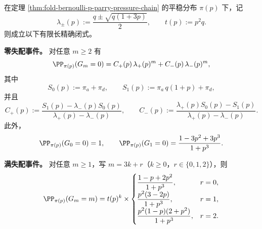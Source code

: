 \begin{theorem}[平稳态端点事件的有限长闭式]\label{thm:fold-bernoulli-p-endpoint-exact-finite}
在定理 \ref{thm:fold-bernoulli-p-parry-pressure-chain} 的平稳分布 \(\pi(p)\) 下，记
\[
\lambda_\pm(p):=\frac{q\pm \sqrt{q(1+3p)}}{2},
\qquad
t(p):=p^2q.
\]
则成立以下有限长精确闭式。

\medskip
\noindent\textbf{零失配事件。}
对任意 \(m\ge 2\) 有
\begin{equation}\label{eq:fold-bernoulli-p-stationary-zero-mismatch-exact}
\PP_{\pi(p)}(G_m=0)=C_+(p)\,\lambda_+(p)^m+C_-(p)\,\lambda_-(p)^m,
\end{equation}
其中
\[
S_0(p):=\pi_a+\pi_d,\qquad
S_1(p):=\pi_a\,q(1+p)+\pi_d,
\]
并且
\begin{equation}\label{eq:fold-bernoulli-p-stationary-zero-mismatch-Cpm}
C_+(p):=\frac{S_1(p)-\lambda_-(p)S_0(p)}{\lambda_+(p)-\lambda_-(p)},\qquad
C_-(p):=\frac{\lambda_+(p)S_0(p)-S_1(p)}{\lambda_+(p)-\lambda_-(p)}.
\end{equation}
此外，
\begin{equation}\label{eq:fold-bernoulli-p-stationary-zero-mismatch-m01}
\PP_{\pi(p)}(G_0=0)=1,\qquad
\PP_{\pi(p)}(G_1=0)=\frac{1-3p^2+3p^3}{1+p^3}.
\end{equation}

\medskip
\noindent\textbf{满失配事件。}
对任意 \(m\ge 1\)，写 \(m=3k+r\)（\(k\ge 0\)，\(r\in\{0,1,2\}\)），则
\begin{equation}\label{eq:fold-bernoulli-p-stationary-full-mismatch-exact}
\PP_{\pi(p)}(G_m=m)=t(p)^k\times
\begin{cases}
\dfrac{1-p+2p^2}{1+p^3}, & r=0,\\[1.0ex]
\dfrac{p^2(3-2p)}{1+p^3}, & r=1,\\[1.0ex]
\dfrac{p^2(1-p)(2+p^2)}{1+p^3}, & r=2.
\end{cases}
\end{equation}
\end{theorem}
